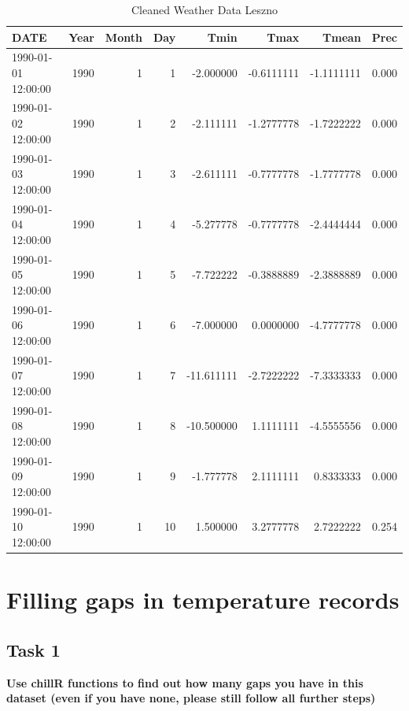 \documentclass[
]{book}
\begin{document}
\begin{table}

\caption{\label{tab:unnamed-chunk-31}Cleaned Weather Data Leszno}
\fontsize{10}{12}\selectfont
\begin{tabular}[t]{l|r|r|r|r|r|r|r}
\hline
DATE & Year & Month & Day & Tmin & Tmax & Tmean & Prec\\
\hline
1990-01-01 12:00:00 & 1990 & 1 & 1 & -2.000000 & -0.6111111 & -1.1111111 & 0.000\\
\hline
1990-01-02 12:00:00 & 1990 & 1 & 2 & -2.111111 & -1.2777778 & -1.7222222 & 0.000\\
\hline
1990-01-03 12:00:00 & 1990 & 1 & 3 & -2.611111 & -0.7777778 & -1.7777778 & 0.000\\
\hline
1990-01-04 12:00:00 & 1990 & 1 & 4 & -5.277778 & -0.7777778 & -2.4444444 & 0.000\\
\hline
1990-01-05 12:00:00 & 1990 & 1 & 5 & -7.722222 & -0.3888889 & -2.3888889 & 0.000\\
\hline
1990-01-06 12:00:00 & 1990 & 1 & 6 & -7.000000 & 0.0000000 & -4.7777778 & 0.000\\
\hline
1990-01-07 12:00:00 & 1990 & 1 & 7 & -11.611111 & -2.7222222 & -7.3333333 & 0.000\\
\hline
1990-01-08 12:00:00 & 1990 & 1 & 8 & -10.500000 & 1.1111111 & -4.5555556 & 0.000\\
\hline
1990-01-09 12:00:00 & 1990 & 1 & 9 & -1.777778 & 2.1111111 & 0.8333333 & 0.000\\
\hline
1990-01-10 12:00:00 & 1990 & 1 & 10 & 1.500000 & 3.2777778 & 2.7222222 & 0.254\\
\hline
\end{tabular}
\end{table}

\hypertarget{filling-gaps-in-temperature-records}{%
\chapter{Filling gaps in temperature records}\label{filling-gaps-in-temperature-records}}

\hypertarget{task-1-6}{%
\section{Task 1}\label{task-1-6}}

\textbf{Use chillR functions to find out how many gaps you have in this dataset (even if you have none, please still follow all further steps)}
\end{document}
